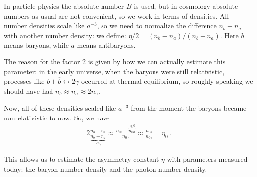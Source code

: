 \documentclass[main.tex]{subfiles}
\begin{document}
In particle physics the absolute number \(B\) is used, but in cosmology absolute numbers as usual are not convenient, so we work in terms of densities. All number densities scale like \(a^{-3}\), so we need to normalize the difference \(n_b - n_a\) with another number density: we define: \(\eta/2 = (n_b - n_a) / (n_b + n_a)\). Here \(b\) means baryons, while \(a\) means antibaryons. 

The reason for the factor 2 is given by how we can actually estimate this parameter: in the early universe, when the baryons were still relativistic, processes like \(b + \overline{b} \leftrightarrow 2 \gamma \) occurred at thermal equilibrium, so roughly speaking we should have had \(n_b \approx n_a \approx 2 n_\gamma \).


Now, all of these densities scaled like \(a^{-3}\) from the moment the baryons became nonrelativistic to now. So, we have 
%
\begin{align}
2 \frac{n_b - n_a}{\underbrace{n_b + n_a}_{2 n_\gamma }} \approx \frac{n_{0b} - \overbrace{n_{0a}}^{\approx 0}}{n_{0\gamma}} \approx \frac{n_{0b}}{n_{0 \gamma }}  = \eta_0 
\,.
\end{align}
 
This allows us to estimate the asymmetry constant \(\eta \) with parameters measured today: the baryon number density and the photon number density. 

\end{document}
